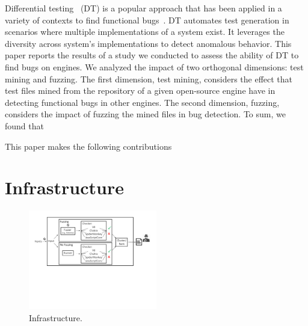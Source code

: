 \documentclass[10pt,conference,anonymous]{IEEEtran}
\begin{document}
Differential testing~\cite{Brumley-etal-ss07} (DT) is a popular
approach that has been applied in a variety of contexts to find
functional
bugs~\cite{Yang-etal-pldi11,Chen-etal-fse2015,Argyros-etla-ccs16,Chen-etal-pldi16,petsios-etal-sp2017,SivakornAPKJ17}. DT
automates test generation in scenarios where multiple implementations
of a system exist. It leverages the diversity across system's
implementations to detect anomalous behavior.
This paper reports the results of a study we conducted to assess the
ability of DT to find bugs on \js{} engines.  We analyzed
the impact of two orthogonal dimensions: test mining and fuzzing. The
first dimension, test mining, considers the effect that \js{} test
files mined from the repository of a given open-source engine have in
detecting functional bugs in other engines. The second dimension,
fuzzing, considers the impact of fuzzing the mined files in bug
detection.
To sum, we found that 

This paper makes the following contributions 


\section{Infrastructure}
\label{sec:design}


\begin{figure}[t]
  \centering
  \includegraphics[trim=0 250 0 0,clip,width=0.5\textwidth]{google-awards-workflow}  
  \caption{\label{fig:workflow}Infrastructure.}
\end{figure}
\end{document}
